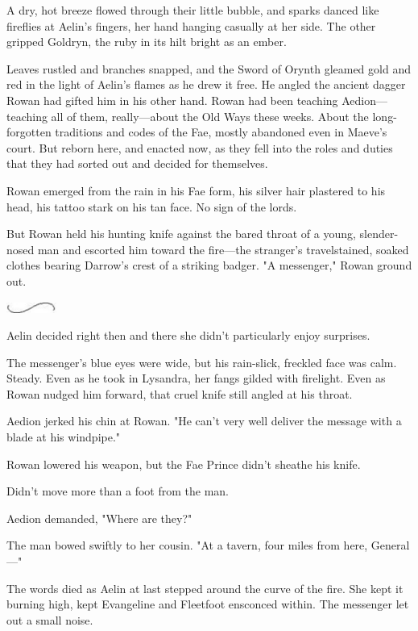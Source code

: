A dry, hot breeze flowed through their little bubble, and sparks danced like fireflies at Aelin's fingers, her hand hanging casually at her side. The other gripped Goldryn, the ruby in its hilt bright as an ember.

Leaves rustled and branches snapped, and the Sword of Orynth gleamed gold and red in the light of Aelin's flames as he drew it free. He angled the ancient dagger Rowan had gifted him in his other hand. Rowan had been teaching Aedion---teaching all of them, really---about the Old Ways these weeks. About the long-forgotten traditions and codes of the Fae, mostly abandoned even in Maeve's court. But reborn here, and enacted now, as they fell into the roles and duties that they had sorted out and decided for themselves.

Rowan emerged from the rain in his Fae form, his silver hair plastered to his head, his tattoo stark on his tan face. No sign of the lords.

But Rowan held his hunting knife against the bared throat of a young, slender-nosed man and escorted him toward the fire---the stranger's travelstained, soaked clothes bearing Darrow's crest of a striking badger. "A messenger," Rowan ground out.

\includegraphics[width=0.65in,height=0.13in]{images/seperator}

Aelin decided right then and there she didn't particularly enjoy surprises.

The messenger's blue eyes were wide, but his rain-slick, freckled face was calm. Steady. Even as he took in Lysandra, her fangs gilded with firelight. Even as Rowan nudged him forward, that cruel knife still angled at his throat.

Aedion jerked his chin at Rowan. "He can't very well deliver the message with a blade at his windpipe."

Rowan lowered his weapon, but the Fae Prince didn't sheathe his knife.

Didn't move more than a foot from the man.

Aedion demanded, "Where are they?"

The man bowed swiftly to her cousin. "At a tavern, four miles from here, General---"

The words died as Aelin at last stepped around the curve of the fire. She kept it burning high, kept Evangeline and Fleetfoot ensconced within. The messenger let out a small noise.

